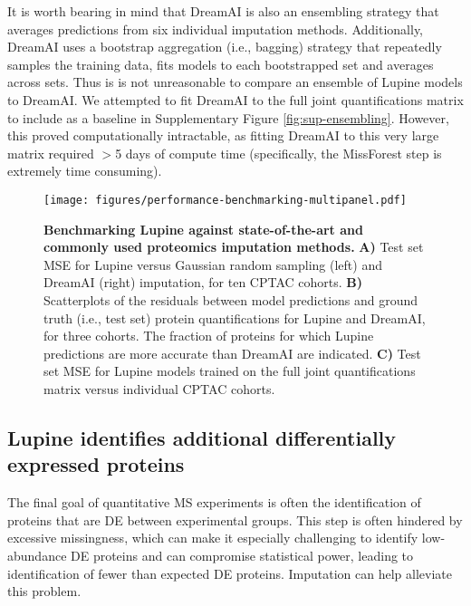 \documentclass{article}
\newcommand{\fixme}[1]{{\color{red}{#1}}}
\begin{document}

It is worth bearing in mind that DreamAI is also an ensembling strategy that averages predictions from six individual imputation methods. Additionally, DreamAI uses a bootstrap aggregation (i.e., bagging) strategy that repeatedly samples the training data, fits models to each bootstrapped set and averages across sets. Thus is is not unreasonable to compare an ensemble of Lupine models to DreamAI. We attempted to fit DreamAI to the full joint quantifications matrix to include as a baseline in Supplementary Figure \ref{fig:sup-ensembling}. However, this proved computationally intractable, as fitting DreamAI to this very large matrix required $>$5 days of compute time (specifically, the MissForest step is extremely time consuming).

\begin{figure}
  \centering
  \texttt{[image: figures/performance-benchmarking-multipanel.pdf]}
  \caption{{\bf Benchmarking Lupine against state-of-the-art and commonly used proteomics imputation methods.} 
  \textbf{A)} Test set MSE for Lupine versus Gaussian random sampling (left) and DreamAI (right) imputation, for ten CPTAC cohorts. 
  \textbf{B)} Scatterplots of the residuals between model predictions and ground truth (i.e., test set) protein quantifications for Lupine and DreamAI, for three cohorts. The fraction of proteins for which Lupine predictions are more accurate than DreamAI are indicated. 
  \textbf{C)} Test set MSE for Lupine models trained on the full joint quantifications matrix versus individual CPTAC cohorts.}
  \label{fig:mse-compare}
\end{figure} 

\subsection{Lupine identifies additional differentially expressed proteins}

The final goal of quantitative MS experiments is often the identification of proteins that are DE between experimental groups. This step is often hindered by excessive missingness, which can make it especially challenging to identify low-abundance DE proteins and can compromise statistical power, leading to identification of fewer than expected DE proteins. Imputation can help alleviate this problem. 
\end{document}
